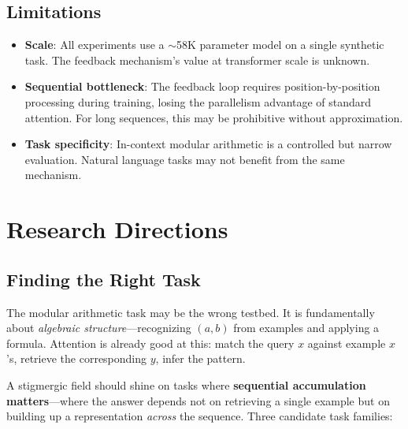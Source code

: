 \documentclass[11pt,a4paper]{article}
\begin{document}
\subsection{Limitations}

\begin{itemize}
    \item \textbf{Scale}: All experiments use a $\sim$58K parameter
          model on a single synthetic task. The feedback mechanism's
          value at transformer scale is unknown.
    \item \textbf{Sequential bottleneck}: The feedback loop requires
          position-by-position processing during training, losing the
          parallelism advantage of standard attention. For long
          sequences, this may be prohibitive without approximation.
    \item \textbf{Task specificity}: In-context modular arithmetic is
          a controlled but narrow evaluation. Natural language tasks
          may not benefit from the same mechanism.
\end{itemize}


\section{Research Directions}
\label{sec:directions}

\subsection{Finding the Right Task}
\label{sec:right_task}

The modular arithmetic task may be the wrong testbed. It is
fundamentally about \emph{algebraic structure}---recognizing $(a, b)$
from examples and applying a formula. Attention is already good at
this: match the query $x$ against example $x$'s, retrieve the
corresponding $y$, infer the pattern.

A stigmergic field should shine on tasks where \textbf{sequential
accumulation matters}---where the answer depends not on retrieving a
single example but on building up a representation \emph{across} the
sequence. Three candidate task families:
\end{document}
